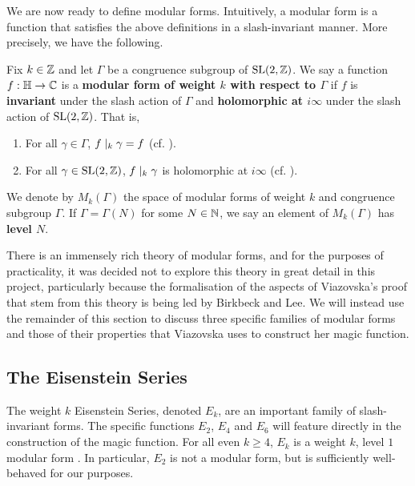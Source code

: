We are now ready to define modular forms. Intuitively, a modular form is a function that satisfies the above definitions in a slash-invariant manner. More precisely, we have the following.

\begin{boxdefinition}
    Fix $k \in \mathbb{Z}$ and let $\Gamma$ be a congruence subgroup of $\operatorname{SL}\!\left( 2, \mathbb{Z} \right)$. We say a function $f : \mathbb{H} \to \mathbb{C}$ is a \textbf{modular form of weight $k$ with respect to $\Gamma$} if $f$ is \textbf{invariant} under the slash action of $\Gamma$ and \textbf{holomorphic at $i\infty$} under the slash action of $\operatorname{SL}\!\left( 2, \mathbb{Z} \right)$. That is,
    \begin{enumerate}
        \item For all $\gamma \in \Gamma$, $f \mid_k \gamma = f$ (cf. ).
        \item For all $\gamma \in \operatorname{SL}\!\left( 2, \mathbb{Z} \right)$, $f \mid_k \gamma$ is holomorphic at $i\infty$ (cf. ).
    \end{enumerate}
    We denote by $M_k(\Gamma)$ the space of modular forms of weight $k$ and congruence subgroup $\Gamma$. If $\Gamma = \Gamma(N)$ for some $N \in \mathbb{N}$, we say an element of $M_k(\Gamma)$ has \textbf{level $N$}.
\end{boxdefinition}

There is an immensely rich theory of modular forms, and for the purposes of practicality, it was decided not to explore this theory in great detail in this project, particularly because the formalisation of the aspects of Viazovska's proof that stem from this theory is being led by Birkbeck and Lee. We will instead use the remainder of this section to discuss three specific families of modular forms and those of their properties that Viazovska uses to construct her magic function.

\subsection{The Eisenstein Series}
\label{Ch2:Subsec:EisensteinSeries}

The weight $k$ Eisenstein Series, denoted $E_k$, are an important family of slash-invariant forms. The specific functions $E_2$, $E_4$ and $E_6$ will feature directly in the construction of the magic function. For all even $k \geq 4$, $E_k$ is a weight $k$, level $1$ modular form \cite[pp. 4-5]{DiamondShurman}. In particular, $E_2$ is not a modular form, but is sufficiently well-behaved for our purposes.

